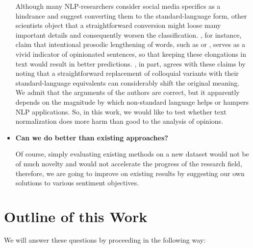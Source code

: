 \begin{itemize}
  Although many NLP-researchers consider social media specifics as a
  hindrance and suggest converting them to the standard-language form,
  other scientists object that a straightforward conversion might
  loose many important details and consequently worsen the
  classification.  \citet{Brody:11}, for instance, claim that
  intentional prosodic lengthening of words, such as
   or , serves as a
  vivid indicator of opinionated sentences, so that keeping these
  elongations in text would result in better predictions.
  \citet{Eisenstein:13}, in part, agrees with these claims by noting
  that a straightforward replacement of colloquial variants with their
  standard-language equivalents can considerably shift the original
  meaning.  We admit that the arguments of the authors are correct,
  but it apparently depends on the magnitude by which non-standard
  language helps or hampers NLP applications.  So, in this work, we
  would like to test whether text normalization does more harm than
  good to the analysis of opinions.

\item\textbf{Can we do better than existing approaches?}

  Of course, simply evaluating existing methods on a new dataset would
  not be of much novelty and would not accelerate the progress of the
  research field, therefore, we are going to improve on existing
  results by suggesting our own solutions to various sentiment
  objectives.
\end{itemize}


\section*{Outline of this Work}

We will answer these questions by proceeding in the following way:

